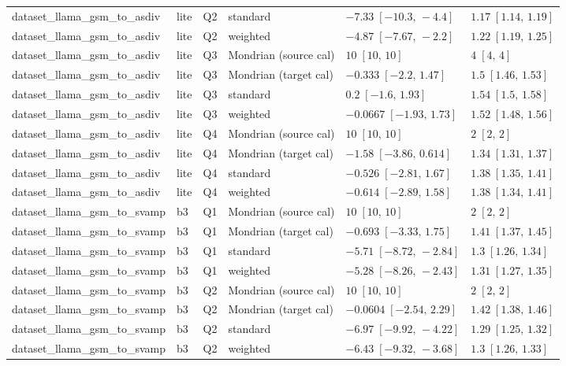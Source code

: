 \begin{longtable}{@{}p{}p{}p{}p{}p{}p{}@{}}
dataset\_llama\_gsm\_to\_asdiv & lite & Q2 & standard & $-7.33\;[-10.3,\,-4.4]$ & $1.17\;[1.14,\,1.19]$ \\
dataset\_llama\_gsm\_to\_asdiv & lite & Q2 & weighted & $-4.87\;[-7.67,\,-2.2]$ & $1.22\;[1.19,\,1.25]$ \\
dataset\_llama\_gsm\_to\_asdiv & lite & Q3 & Mondrian (source cal) & $10\;[10,\,10]$ & $4\;[4,\,4]$ \\
dataset\_llama\_gsm\_to\_asdiv & lite & Q3 & Mondrian (target cal) & $-0.333\;[-2.2,\,1.47]$ & $1.5\;[1.46,\,1.53]$ \\
dataset\_llama\_gsm\_to\_asdiv & lite & Q3 & standard & $0.2\;[-1.6,\,1.93]$ & $1.54\;[1.5,\,1.58]$ \\
dataset\_llama\_gsm\_to\_asdiv & lite & Q3 & weighted & $-0.0667\;[-1.93,\,1.73]$ & $1.52\;[1.48,\,1.56]$ \\
dataset\_llama\_gsm\_to\_asdiv & lite & Q4 & Mondrian (source cal) & $10\;[10,\,10]$ & $2\;[2,\,2]$ \\
dataset\_llama\_gsm\_to\_asdiv & lite & Q4 & Mondrian (target cal) & $-1.58\;[-3.86,\,0.614]$ & $1.34\;[1.31,\,1.37]$ \\
dataset\_llama\_gsm\_to\_asdiv & lite & Q4 & standard & $-0.526\;[-2.81,\,1.67]$ & $1.38\;[1.35,\,1.41]$ \\
dataset\_llama\_gsm\_to\_asdiv & lite & Q4 & weighted & $-0.614\;[-2.89,\,1.58]$ & $1.38\;[1.34,\,1.41]$ \\
dataset\_llama\_gsm\_to\_svamp & b3 & Q1 & Mondrian (source cal) & $10\;[10,\,10]$ & $2\;[2,\,2]$ \\
dataset\_llama\_gsm\_to\_svamp & b3 & Q1 & Mondrian (target cal) & $-0.693\;[-3.33,\,1.75]$ & $1.41\;[1.37,\,1.45]$ \\
dataset\_llama\_gsm\_to\_svamp & b3 & Q1 & standard & $-5.71\;[-8.72,\,-2.84]$ & $1.3\;[1.26,\,1.34]$ \\
dataset\_llama\_gsm\_to\_svamp & b3 & Q1 & weighted & $-5.28\;[-8.26,\,-2.43]$ & $1.31\;[1.27,\,1.35]$ \\
dataset\_llama\_gsm\_to\_svamp & b3 & Q2 & Mondrian (source cal) & $10\;[10,\,10]$ & $2\;[2,\,2]$ \\
dataset\_llama\_gsm\_to\_svamp & b3 & Q2 & Mondrian (target cal) & $-0.0604\;[-2.54,\,2.29]$ & $1.42\;[1.38,\,1.46]$ \\
dataset\_llama\_gsm\_to\_svamp & b3 & Q2 & standard & $-6.97\;[-9.92,\,-4.22]$ & $1.29\;[1.25,\,1.32]$ \\
dataset\_llama\_gsm\_to\_svamp & b3 & Q2 & weighted & $-6.43\;[-9.32,\,-3.68]$ & $1.3\;[1.26,\,1.33]$ \\

\end{longtable}
